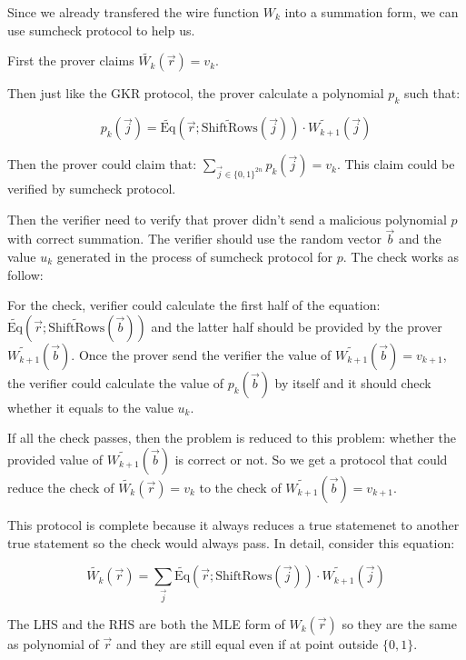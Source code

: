 \documentclass[12pt]{article}
\newenvironment{ex}[2][Exercise]{\begin{trivlist}
\item[\hskip \labelsep {\bfseries #1}\hskip \labelsep {\bfseries #2.}]\begin{spacing}{1.0}}{\end{spacing}\end{trivlist}}
\newenvironment{sol}[1][Solution]{\begin{trivlist}
\item[\hskip \labelsep {\bfseries #1:}]}{\end{trivlist}}
\begin{document}
\begin{ex}{1.d}
\end{ex}
\begin{sol}
    Since we already transfered the wire function $W_k$ into a summation form, we can use sumcheck protocol to help us.

    First the prover claims $\tilde{W_k}(\vec{r}) =v_k$.

    Then just like the GKR protocol, the prover calculate a polynomial $p_k$ such that:

    $$
        p_k(\vec{j}) = \tilde{\text{Eq}}(\vec{r};\tilde{\text{ShiftRows}}(\vec{j})) \cdot \tilde{W_{k+1}}(\vec{j})
    $$

    Then the prover could claim that: $\sum_{\vec{j}\in \{0,1\}^{2n}} p_k(\vec{j}) = v_k$. This claim could be verified by sumcheck protocol.

    Then the verifier need to verify that prover didn't send a malicious polynomial $p$ with correct summation. The verifier should use the random vector $\vec{b}$ and the value $u_k$ generated in the process of sumcheck protocol for $p$. The check works as follow:

    For the check, verifier could calculate the first half of the equation: $\tilde{\text{Eq}}(\vec{r};\tilde{\text{ShiftRows}}(\vec{b}))$ and the latter half should be provided by the prover $\tilde{W_{k+1}}(\vec{b})$. Once the prover send the verifier the value of $\tilde{W_{k+1}}(\vec{b}) = v_{k+1}$, the verifier could calculate the value of $p_k(\vec{b})$ by itself and it should check whether it equals to the value $u_k$.

    If all the check passes, then the problem is reduced to this problem: whether the provided value of $\tilde{W_{k+1}}(\vec{b})$ is correct or not. So we get a protocol that could reduce the check of $\tilde{W_k}(\vec{r}) = v_k$ to the check of $\tilde{W_{k+1}}(\vec{b}) = v_{k+1}$.

    This protocol is complete because it always reduces a true statemenet to another true statement so the check would always pass. In detail, consider this equation:

    $$
        \tilde{W_k}(\vec{r}) = \sum_{\vec{j}} \tilde{\text{Eq}}(\vec{r};\text{ShiftRows}(\vec{j})) \cdot \tilde{W_{k+1}}(\vec{j})
    $$

    The LHS and the RHS are both the MLE form of $W_k(\vec{r})$ so they are the same as polynomial of $\vec{r}$ and they are still equal even if at point outside $\{0,1\}$.


\end{sol}
\end{document}
